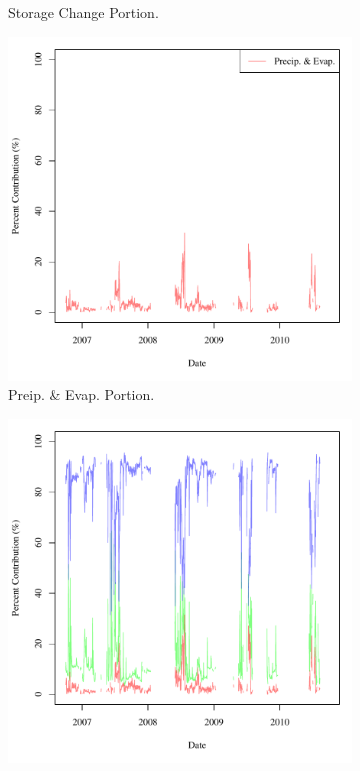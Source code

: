 \begin{linenumbers}
\begin{figure}[htbp]
\begin{subfigure}{0.5\textwidth}
		\caption{Storage Change Portion.}
	\end{subfigure}
	\tablevspace
	\begin{subfigure}{0.5\textwidth}
		\centering
		\includegraphics[width=\tableCustomSize]{"Figures/Results_DSR/Stochastic/M Water Contrib 2"}
		\caption{Preip. \& Evap. Portion.}
	\end{subfigure}%
	\begin{subfigure}{0.5\textwidth}
		\centering
		\includegraphics[width=\tableCustomSize]{"Figures/Results_DSR/Stochastic/M Water Contrib 4"}

\end{subfigure}
\end{figure}
\end{linenumbers}
